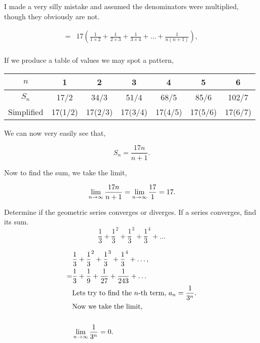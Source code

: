 \documentclass{article}
\begin{document}
            \rans I made a very silly mistake and assumed the denominators were multiplied, though they obviously are not.

            \begin{align*}
                =&17\left( \frac{1}{1\times2} + \frac{1}{2\times3} + \frac{1}{3\times4} + \dots + \frac{1}{n(n+1)} \right),\\
            \end{align*}

            If we produce a table of values we may spot a pattern,

            \begin{center}
                \begin{tabular}{|c|c|c|c|c|c|c|}
                    \hline
                    $n$ & 1 & 2 & 3 & 4 & 5 & 6\\
                    \hline
                    $S_n$ & 17/2 & 34/3 & 51/4 & 68/5 & 85/6 & 102/7\\
                    \hline
                    Simplified & 17(1/2) & 17(2/3) & 17(3/4) & 17(4/5) & 17(5/6) & 17(6/7)\\
                    \hline
                \end{tabular}
            \end{center}

            We can now very easily see that,

            \[S_n = \frac{17n}{n+1}.\]

            Now to find the sum, we take the limit,

            \begin{align*}
                &\lim_{n\rightarrow\infty}\frac{17n}{n+1} = \lim_{n\rightarrow\infty}\frac{17}{1} = 17.\\
            \end{align*}

            Determine if the geometric series converges or diverges. If a series converges, find its sum.\\
            
            \[\frac{1}{3} + \frac{1}{3}^2 + \frac{1}{3}^3 + \frac{1}{3}^4 + \dots\]

            \ans

            \begin{align*}
                &\frac{1}{3} + \frac{1}{3}^2 + \frac{1}{3}^3 + \frac{1}{3}^4 + \dots,\\
                =&\frac{1}{3} + \frac{1}{9} + \frac{1}{27} + \frac{1}{243} + \dots\\
                &\text{Lets try to find the }n\text{-th term, }a_n = \frac{1}{3^n}.\\
                &\text{Now we take the limit,}\\
                &\\
                &\lim_{n\rightarrow\infty} \frac{1}{3^n} = 0.\\
            \end{align*}
\end{document}
